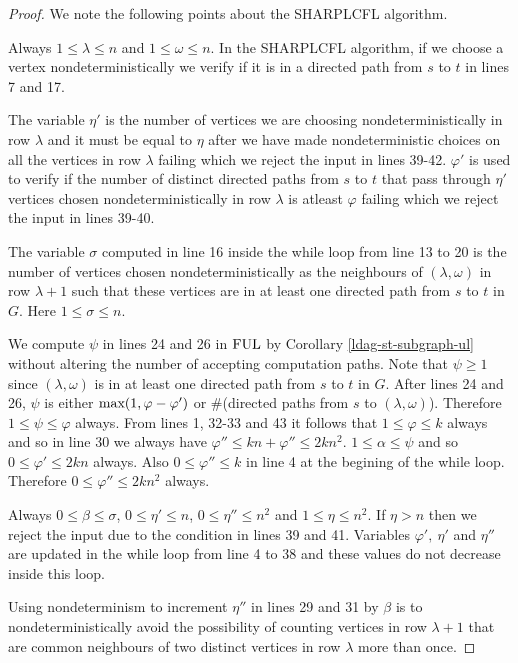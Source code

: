 \documentclass{amsbook}
\theoremstyle{definition}
\theoremstyle{remark}
\numberwithin{section}{chapter}
\numberwithin{equation}{chapter}
\newcommand{\FUL}{\mbox{\rm FUL}}
\begin{document}
\begin{proof}
We note the following points about the SHARPLCFL algorithm.

Always $1\leq\lambda\leq n$ and $1\leq \omega\leq n$. In the {\rm SHARPLCFL} algorithm, if we choose a vertex nondeterministically we verify if it is in a directed path from $s$ to $t$ in lines 7 and 17.

The variable $\eta '$ is the number of vertices we are choosing nondeterministically in row $\lambda$ and it must be equal to $\eta$ after we have made nondeterministic choices on all the vertices in row $\lambda$ failing which we reject the input in lines 39-42. $\varphi '$ is used to verify if the number of distinct directed paths from $s$ to $t$ that pass through $\eta '$ vertices chosen nondeterministically in row $\lambda$ is atleast $\varphi$ failing which we reject the input in lines 39-40.

The variable $\sigma$ computed in line 16 inside the while loop from line 13 to 20 is the number of vertices chosen nondeterministically as the neighbours of $(\lambda ,\omega)$ in row $\lambda +1$ such that these vertices are in at least one directed path from $s$ to $t$ in $G$. Here $1\leq \sigma\leq n$.

We compute $\psi$ in lines 24 and 26 in $\FUL$ by Corollary \ref{ldag-st-subgraph-ul} without altering the number of accepting computation paths. Note that $\psi\geq 1$ since $(\lambda ,\omega)$ is in at least one directed path from $s$ to $t$ in $G$. After lines 24 and 26, $\psi$ is either ${\rm max(}1,\varphi -\varphi ')$ or {\rm \#(}directed paths from $s$ to $(\lambda ,\omega )${\rm )}. Therefore $1\leq\psi\leq\varphi$ always. From lines 1, 32-33 and 43 it follows that $1\leq \varphi\leq k$ always and so in line 30 we always have $\varphi ''\leq kn+\varphi ''\leq 2kn^2$. $1\leq \alpha\leq \psi$ and so $0\leq \varphi'\leq 2kn$ always. Also $0\leq \varphi ''\leq k$ in line 4 at the begining of the while loop. Therefore $0\leq\varphi ''\leq 2kn^2$ always.

Always $0\leq \beta\leq \sigma$, $0\leq \eta '\leq n$, $0\leq \eta ''\leq n^2$ and $1\leq \eta\leq n^2$. If $\eta >n$ then we reject the input due to the condition in lines 39 and 41.  Variables $\varphi ',~\eta '$ and $\eta ''$ are updated in the while loop from line 4 to 38 and these values do not decrease inside this loop.

Using nondeterminism to increment $\eta ''$ in lines 29 and 31 by $\beta$ is to nondeterministically avoid the possibility of counting vertices in row $\lambda +1$ that are common neighbours of two distinct vertices in row $\lambda$ more than once.


\end{proof}
\end{document}

